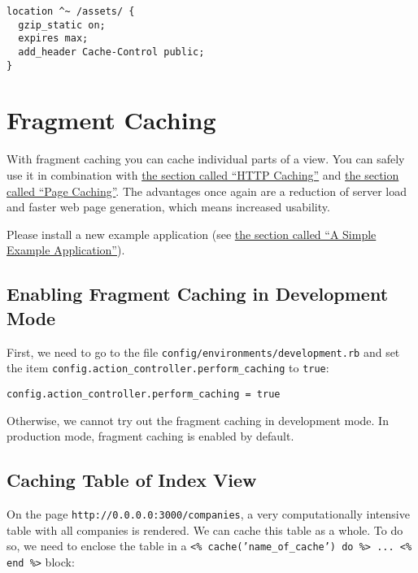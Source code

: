 \documentclass[a4paper]{book}
\newcounter{tab}[chapter]
\newcommand{\chap}[1]{\newpage\thispagestyle{empty}\chapter{#1}\label{chap:\thechapter}}
\begin{document}
\begin{shaded}\begin{verbatim}
location ^~ /assets/ {
  gzip_static on;
  expires max;
  add_header Cache-Control public;
}
\end{verbatim}\end{shaded}

\chap{Fragment Caching}\label{fragment-caching}

With fragment caching you can cache individual parts of a view. You can safely use it in combination with \hyperref[httpux5fcaching]{the section called “HTTP Caching”} and \hyperref[pageux5fcaching]{the section called “Page Caching”}. The advantages once again are a reduction of server load and faster web page generation, which means increased usability.

Please install a new example application (see \hyperref[cachingux5fbeispielapplikation]{the section called “A Simple Example Application”}).

\section{Enabling Fragment Caching in Development Mode}\label{enabling-fragment-caching-in-development-mode}

First, we need to go to the file \texttt{config/environments/development.rb} and set the item \texttt{config.action\_controller.perform\_caching} to \texttt{true}:

\begin{shaded}\begin{verbatim}
config.action_controller.perform_caching = true
\end{verbatim}\end{shaded}

Otherwise, we cannot try out the fragment caching in development mode. In production mode, fragment caching is enabled by default.

\section{Caching Table of Index View}\label{caching-table-of-index-view}

On the page \texttt{http://0.0.0.0:3000/companies}, a very computationally intensive table with all companies is rendered. We can cache this table as a whole. To do so, we need to enclose the table in a \texttt{\textless{}\% cache('name\_of\_cache') do \%\textgreater{} ... \textless{}\% end       \%\textgreater{}} block:
\end{document}
